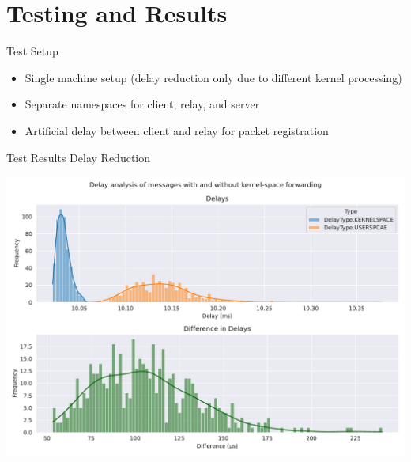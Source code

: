 \documentclass[shortpres,aspectratio=43]{beamer}
\newlength{\mylength}
\begin{document}

\section{Testing and Results}

\begin{frame}{}
  \tableofcontents[currentsection]
\end{frame}

\begin{frame}{Test Setup}
    \begin{minipage}{\textwidth}
        \begin{itemize}
            \item Single machine setup (delay reduction only due to different kernel processing) 
            \vspace{2\mylength}
            \item Separate namespaces for client, relay, and server
            \vspace{2\mylength}
            \item Artificial delay between client and relay for packet registration
        \end{itemize}
    \end{minipage}
\end{frame}

\begin{frame}{Test Results Delay Reduction}
    \begin{minipage}{\textwidth}
        \centering
        \includegraphics[scale=0.4]{../figures/04_testing_and_results/delays_small_packets_simple_userspace.pdf}
    \end{minipage}\hfill
\end{frame}
\end{document}
